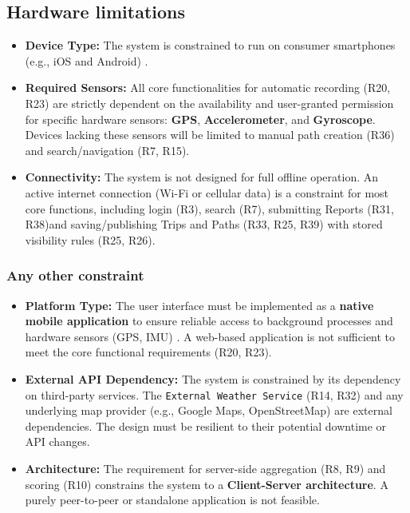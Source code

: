 \subsection{Hardware limitations}
\label{subsec:hardware_limitations}%
\begin{itemize}[leftmargin=*, itemsep=2pt]
    \item \textbf{Device Type:} The system is constrained to run on consumer smartphones (e.g., iOS and Android) .
    \item \textbf{Required Sensors:} All core functionalities for automatic recording (R20, R23) are strictly dependent on the availability and user-granted permission for specific hardware sensors: \textbf{GPS}, \textbf{Accelerometer}, and \textbf{Gyroscope}. Devices lacking these sensors will be limited to manual path creation (R36) and search/navigation (R7, R15).
    \item \textbf{Connectivity:} The system is not designed for full offline operation. An active internet connection (Wi-Fi or cellular data) is a constraint for most core functions, including login (R3), search (R7), submitting Reports (R31, R38)and saving/publishing Trips and Paths (R33, R25, R39) with stored visibility rules (R25, R26).
\end{itemize}

\subsubsection{Any other constraint}
\label{subsec:Any other constraint}%
\begin{itemize}[leftmargin=*, itemsep=2pt]
    \item \textbf{Platform Type:} The user interface must be implemented as a \textbf{native mobile application} to ensure reliable access to background processes and hardware sensors (GPS, IMU) . A web-based application is not sufficient to meet the core functional requirements (R20, R23).
    \item \textbf{External API Dependency:} The system is constrained by its dependency on third-party services. The \texttt{External Weather Service} (R14, R32)  and any underlying map provider (e.g., Google Maps, OpenStreetMap) are external dependencies. The design must be resilient to their potential downtime or API changes.
    \item \textbf{Architecture:} The requirement for server-side aggregation (R8, R9) and scoring (R10) constrains the system to a \textbf{Client-Server architecture}. A purely peer-to-peer or standalone application is not feasible.
\end{itemize}

